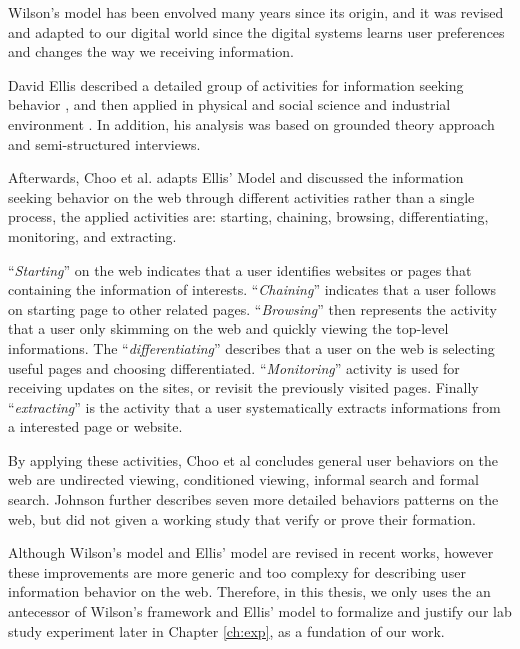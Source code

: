 Wilson's model has been envolved many years since its origin, and it was revised 
and adapted to our digital world since the digital systems learns user preferences and 
changes \cite{giannini1998receiving} the way we receiving information.

David Ellis described a detailed group of activities for information seeking behavior \cite{ellis1989behavioural},
and then applied in physical and social science \cite{ellis1993comparison} and industrial
environment \cite{ellis1997modelling}.
In addition, his analysis was
based on grounded theory approach \cite{aceto1994grounded} and semi-structured interviews. 

Afterwards, Choo et al. adapts Ellis' Model and discussed \cite{choo1999information}
the information seeking behavior on the web through different activities rather 
than a single process, the applied activities are:
starting, chaining, browsing, differentiating, monitoring, and extracting.

``\emph{Starting}'' on the web indicates that a user identifies websites or pages
that containing the information of interests.
``\emph{Chaining}'' indicates that a user follows on starting page to other related pages.
``\emph{Browsing}'' then represents the activity that a user only skimming on the web
and quickly viewing the top-level informations. The ``\emph{differentiating}'' 
describes that a user on the web is selecting useful pages and choosing differentiated.
``\emph{Monitoring}'' activity is used for receiving updates on the sites, or revisit
the previously visited pages. Finally ``\emph{extracting}'' is the activity that a user
systematically extracts informations from a interested page or website.

By applying these activities, Choo et al concludes general user behaviors on the web are
undirected viewing, conditioned viewing, informal search and formal search.
Johnson further describes \cite{johnson2017patterns} seven more detailed behaviors 
patterns on the web, but did not given a working study that verify or prove their formation.

Although Wilson's model and Ellis' model are revised in recent works, however these improvements
are more generic and too complexy for describing user information behavior on the web.
Therefore, in this thesis, we only uses the an antecessor of Wilson's framework \cite{wilson1997information} and 
Ellis' model \cite{ellis1997modelling} to formalize and justify our lab study experiment later in Chapter \ref{ch:exp}, 
as a fundation of our work.

\cleardoublepage